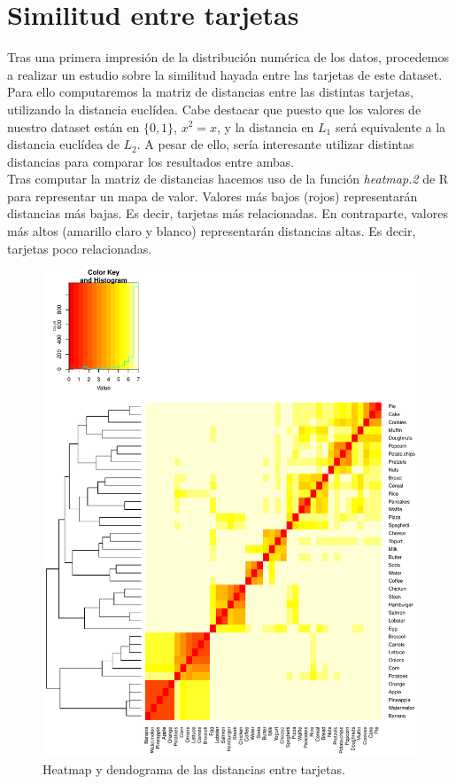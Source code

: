 \documentclass[a4paper]{article}
\begin{document}
\section{Similitud entre tarjetas}

Tras una primera impresión de la distribución numérica de los datos, procedemos a realizar un estudio sobre la similitud hayada entre las tarjetas de este dataset. Para ello computaremos la matriz de distancias entre las distintas tarjetas, utilizando la distancia euclídea. Cabe destacar que puesto que los valores de nuestro dataset están en $\{0,1\}$, $x^2 = x$, y la distancia en $L_1$ será equivalente a la distancia euclídea de $L_2$. A pesar de ello, sería interesante utilizar distintas distancias para comparar los resultados entre ambas. \\

Tras computar la matriz de distancias hacemos uso de la función \emph{heatmap.2} de R para representar un mapa de valor. Valores más bajos (rojos) representarán distancias más bajas. Es decir, tarjetas más relacionadas. En contraparte, valores más altos (amarillo claro y blanco) representarán distancias altas. Es decir, tarjetas poco relacionadas. \\

\begin{figure}[H]
	\includegraphics[scale=.6]{figures/heatmap}
	\centering
	\caption{Heatmap y dendograma de las distancias entre tarjetas.}
\end{figure}
\end{document}

